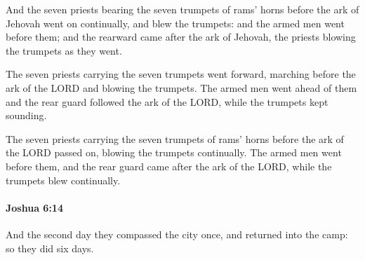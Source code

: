 			\begin{versebox}
					\item[BHS] 
					\item[ASV] And the seven priests bearing the seven trumpets of rams' horns before the ark of Jehovah went on continually, and blew the trumpets: and the armed men went before them; and the rearward came after the ark of Jehovah, the priests blowing the trumpets as they went.
					\item[NIV] The seven priests carrying the seven trumpets went forward, marching before the ark of the LORD and blowing the trumpets. The armed men went ahead of them and the rear guard followed the ark of the LORD, while the trumpets kept sounding.
					\item[NRSV] The seven priests carrying the seven trumpets of rams’ horns before the ark of the LORD passed on, blowing the trumpets continually. The armed men went before them, and the rear guard came after the ark of the LORD, while the trumpets blew continually.
			\end{versebox}

		\paragraph{Joshua 6:14} %
			\label{JOSHUA-6-14}

			And the second day they compassed the city once, and returned into the camp: so they did six days.

